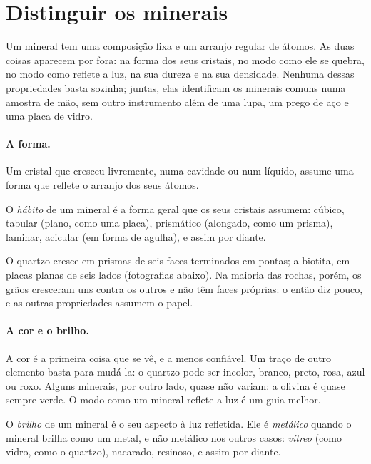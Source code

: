 \section{Distinguir os minerais}

Um mineral tem uma composição fixa e um arranjo regular de átomos. As duas
coisas aparecem por fora: na forma dos seus cristais, no modo como ele se
quebra, no modo como reflete a luz, na sua dureza e na sua densidade.
Nenhuma dessas propriedades basta sozinha; juntas, elas identificam os
minerais comuns numa amostra de mão, sem outro instrumento além de uma lupa,
um prego de aço e uma placa de vidro.

\paragraph{A forma.} Um cristal que cresceu livremente, numa cavidade ou num
líquido, assume uma forma que reflete o arranjo dos seus átomos.

\begin{definition}[Hábito]\label{def:g11:minerals:habit}
O \emph{hábito} de um
mineral é a forma geral que os seus cristais assumem: cúbico, tabular (plano,
como uma placa), prismático (alongado, como um prisma), laminar, acicular
(em forma de agulha), e assim por diante.
\end{definition}

O quartzo cresce em prismas de seis faces terminados em pontas; a biotita,
em placas planas de seis lados (fotografias abaixo). Na maioria das rochas,
porém, os grãos cresceram uns contra os outros e não têm faces próprias: o
 então diz pouco, e as outras propriedades assumem o papel.

\paragraph{A cor e o brilho.} A cor é a primeira coisa que se vê, e a menos
confiável. Um traço de outro elemento basta para mudá-la: o quartzo pode ser
incolor, branco, preto, rosa, azul ou roxo. Alguns minerais, por outro lado,
quase não variam: a olivina é quase sempre verde. O modo como um mineral
reflete a luz é um guia melhor.

\begin{definition}[Brilho]\label{def:g11:minerals:lustre}
O \emph{brilho} de um mineral é o seu aspecto à luz refletida.
Ele é \emph{metálico} quando o mineral brilha como um metal, e não metálico
nos outros casos: \emph{vítreo} (como vidro, como o quartzo), nacarado,
resinoso, e assim por diante.
\end{definition}

